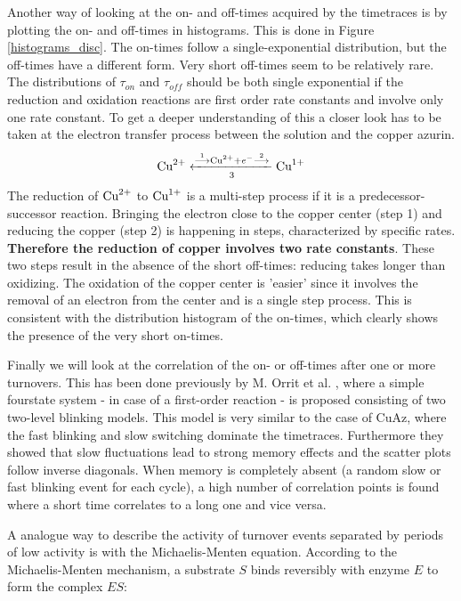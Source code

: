 \documentclass[twoside,single]{lion-msc}
\begin{document}
Another way of looking at the on- and off-times acquired by the timetraces is by plotting the on- and off-times in histograms. This is done in Figure \ref{histograms_disc}. The on-times follow a single-exponential distribution, but the off-times have a different form. Very short off-times seem to be relatively rare. The distributions of  $\tau_{on}$ and  $\tau_{off}$ should be both single exponential if the reduction and oxidation reactions are first order rate constants and involve only one rate constant. To get a deeper understanding of this a closer look has to be taken at the electron transfer process between the solution and the copper azurin.
\begin{equation}\label{ox_pros}
\textup{Cu}^{2+}\xleftarrow[3]{\overset{1}{\longrightarrow}\textup{Cu}^{2+}+ e^{-}\overset{2}{\longrightarrow}}\textup{Cu}^{1+}
\end{equation}
The reduction of $\textup{Cu}^{2+}$ to $\textup{Cu}^{1+}$ is a multi-step process if it is a predecessor-successor reaction. Bringing the electron close to the copper center (step 1) and reducing the copper (step 2) is happening in steps, characterized by specific rates. \textbf{Therefore the reduction of copper involves two rate constants}. These two steps result in the absence of the short off-times: reducing takes longer than oxidizing. The oxidation of the copper center is 'easier' since it involves the removal of an electron from the center and is a single step process. This is consistent with the distribution histogram of the on-times, which clearly shows the presence of the very short on-times.

Finally we will look at the correlation of the on- or off-times after one or more turnovers. This has been done previously by M. Orrit et al. \cite{Lippitz2005}, where a simple fourstate system - in case of a first-order reaction - is proposed consisting of two two-level blinking models. This model is very similar to the case of CuAz, where the fast blinking and slow switching dominate the timetraces. Furthermore they showed that slow fluctuations lead to strong memory effects and the scatter plots follow inverse diagonals. When memory is completely absent (a random slow or fast blinking event for each cycle), a high number of correlation points is found where a short time correlates to a long one and vice versa. 

A analogue way to describe the activity of turnover events separated by periods of low activity is with the Michaelis-Menten equation. According to the Michaelis-Menten mechanism, a substrate $S$ binds reversibly with enzyme $E$ to form the complex $ES$:
\end{document}
